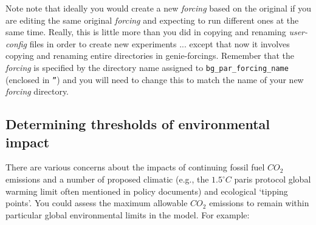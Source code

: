 \vspace{1mm}

Note note that ideally you would create a new \textit{forcing} based on the original if you are editing the same original  \textit{forcing} and expecting to run different ones at the same time. Really, this is little more than you did in copying and renaming \textit{user-config} files in order to create new experiments ... except that now it involves copying and renaming entire directories in \textsf{\footnotesize genie-forcings}. Remember that the \textit{forcing} is specified by the directory name assigned to \texttt{bg\_par\_forcing\_name} (enclosed in \texttt{''}) and you will need to change this to match the name of your new \textit{forcing} directory.


\subsection{Determining thresholds of environmental impact}

There are various concerns about the impacts of continuing fossil fuel \(CO_{2}\) emissions and a number of proposed climatic (e.g., the \(1.5^{\circ} C \) paris protocol global warming limit often mentioned in policy documents) and ecological ‘tipping points’. You could assess the maximum allowable \(CO_{2}\) emissions to remain within particular global environmental limits in the model. For example:

